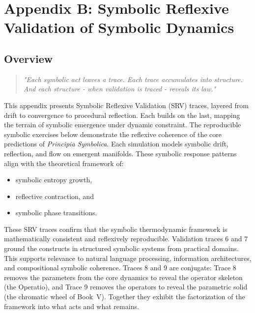 ﻿\clearpage
{}
\chapter*{Appendix B: Symbolic Reflexive Validation of Symbolic Dynamics}
\section*{Overview}
\label{sec:appB_overview}
\begin{quote}
\emph{"Each symbolic act leaves a trace.  
Each trace accumulates into structure.  
And each structure - when validation is traced - reveals its law."}
\end{quote}
\vspace{1em}
This appendix presents Symbolic Reflexive Validation (SRV) traces, layered from drift to convergence to procedural reflection.  
Each builds on the last, mapping the terrain of symbolic emergence under dynamic constraint.
The reproducible symbolic exercises below demonstrate the reflexive coherence  
of the core predictions of \emph{Principia Symbolica}.  
Each simulation models symbolic drift, reflection, and flow on emergent manifolds.
These symbolic response patterns align with the theoretical framework of:
\begin{itemize}
  \item symbolic entropy growth,
  \item reflective contraction, and
  \item symbolic phase transitions.
\end{itemize}
These SRV traces confirm that the symbolic thermodynamic framework is
mathematically consistent and reflexively reproducible.
Validation traces 6 and 7 ground the constructs in structured symbolic systems
from practical domains.
This supports relevance to natural language processing, information
architectures, and compositional symbolic coherence.
Traces 8 and 9 are conjugate: Trace 8 removes the parameters from the core
dynamics to reveal the operator skeleton (the Operatio), and Trace 9 removes
the operators to reveal the parametric solid (the chromatic wheel of
Book~V). Together they exhibit the factorization of the framework into what
acts and what remains.

